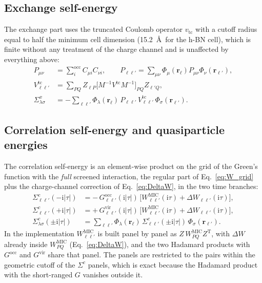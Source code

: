 \documentclass[%
 reprint,
superscriptaddress,
 amsmath,amssymb,
 aps,
prb,
]{revtex4-2}
\newcommand{\br}{\mathbf{r}}
\newcommand{\ii}{\mathrm{i}}
\newcommand{\MIC}{\mathrm{MIC}}
\newcommand{\Tr}{\mathrm{T}}
\newcommand{\occ}{\mathrm{occ}}
\newcommand{\vir}{\mathrm{vir}}
\newcommand{\tc}{\mathrm{tc}}
\begin{document}
\subsection{Exchange self-energy}
\label{sec:Sx}

The exchange part uses the truncated Coulomb operator $v_\tc$ with a cutoff radius equal to
half the minimum cell dimension (15.2~\AA\ for the h-BN cell), which is finite without any
treatment of the charge channel and is unaffected by everything above:
\begin{align}
  P_{\mu\nu} &= \sum_i^{\occ} C_{\mu i}C_{\nu i},\qquad
  P_{\ell\ell'} = \sum_{\mu\nu}\Phi_\mu(\br_\ell)P_{\mu\nu}\Phi_\nu(\br_{\ell'}),
  \label{eq:Sx_parts}\\
  V^\tc_{\ell\ell'} &= \sum_{PQ}Z_{\ell P}\big[M^{-1}V^\tc M^{-1}\big]_{PQ}Z_{\ell'Q},
  \label{eq:Vtc_grid}\\
  \Sigma^x_{\lambda\sigma} &= -\sum_{\ell\ell'}\Phi_\lambda(\br_\ell)\,P_{\ell\ell'}\,V^\tc_{\ell\ell'}\,\Phi_\sigma(\br_{\ell'}).
  \label{eq:Sx}
\end{align}

\subsection{Correlation self-energy and quasiparticle energies}
\label{sec:Sc}

The correlation self-energy is an element-wise product on the grid of the Green's function with
the \emph{full} screened interaction, the regular part of Eq.~\eqref{eq:W_grid} plus the
charge-channel correction of Eq.~\eqref{eq:DeltaW}, in the two time branches:
\begin{align}
  \Sigma^{c}_{\ell\ell'}(-\ii|\tau|) &= -\,G^\occ_{\ell\ell'}(\ii|\tau|)\,
  \Big[W^\MIC_{\ell\ell'}(\ii\tau) + \Delta W_{\ell\ell'}(\ii\tau)\Big],
  \label{eq:Sc_neg}\\
  \Sigma^{c}_{\ell\ell'}(+\ii|\tau|) &= +\,G^\vir_{\ell\ell'}(\ii|\tau|)\,
  \Big[W^\MIC_{\ell\ell'}(\ii\tau) + \Delta W_{\ell\ell'}(\ii\tau)\Big],
  \label{eq:Sc_pos}\\
  \Sigma^{c}_{\lambda\sigma}(\pm\ii|\tau|) &= \sum_{\ell\ell'}\Phi_\lambda(\br_\ell)\,
  \Sigma^{c}_{\ell\ell'}(\pm\ii|\tau|)\,\Phi_\sigma(\br_{\ell'}).
  \label{eq:Sc_ao}
\end{align}
In the implementation $W^\MIC_{\ell\ell'}$ is built panel by panel as $Z\,W^\MIC_{PQ}Z^\Tr$,
with $\Delta W$ already inside $W^\MIC_{PQ}$ (Eq.~\eqref{eq:DeltaW}), and the two Hadamard
products with $G^\occ$ and $G^\vir$ share that panel. The panels are restricted to the pairs
within the geometric cutoff of the $\Sigma^c$ panels, which is exact because the Hadamard
product with the short-ranged $G$ vanishes outside it.
\end{document}
